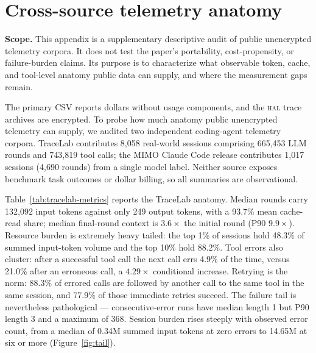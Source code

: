 \documentclass[11pt]{article}
\newcommand{\hal}{\textsc{hal}}
\begin{document}
\appendix

\section{Cross-source telemetry anatomy}
\label{app:telemetry}

\textbf{Scope.} This appendix is a supplementary descriptive audit of public unencrypted telemetry corpora. It does not test the paper's portability, cost-propensity, or failure-burden claims. Its purpose is to characterize what observable token, cache, and tool-level anatomy public data can supply, and where the measurement gaps remain.

The primary CSV reports dollars without usage components, and the \hal{} trace archives are encrypted. To probe how much anatomy public unencrypted telemetry can supply, we audited two independent coding-agent telemetry corpora. TraceLab contributes 8,058 real-world sessions comprising 665,453 LLM rounds and 743,819 tool calls; the MIMO Claude Code release contributes 1,017 sessions (4,690 rounds) from a single model label. Neither source exposes benchmark task outcomes or dollar billing, so all summaries are observational.

Table~\ref{tab:tracelab-metrics} reports the TraceLab anatomy. Median rounds carry 132,092 input tokens against only 249 output tokens, with a 93.7\% mean cache-read share; median final-round context is \(3.6\times\) the initial round (P90 \(9.9\times\)). Resource burden is extremely heavy tailed: the top 1\% of sessions hold 48.3\% of summed input-token volume and the top 10\% hold 88.2\%. Tool errors also cluster: after a successful tool call the next call errs 4.9\% of the time, versus 21.0\% after an erroneous call, a \(4.29\times\) conditional increase. Retrying is the norm: 88.3\% of errored calls are followed by another call to the same tool in the same session, and 77.9\% of those immediate retries succeed. The failure tail is nevertheless pathological --- consecutive-error runs have median length 1 but P90 length 3 and a maximum of 368. Session burden rises steeply with observed error count, from a median of 0.34M summed input tokens at zero errors to 14.65M at six or more (Figure~\ref{fig:tail}).

\begin{table}[h]
\centering\small
\caption{TraceLab key telemetry metrics.}
\label{tab:tracelab-metrics}

\end{table}
\end{document}
